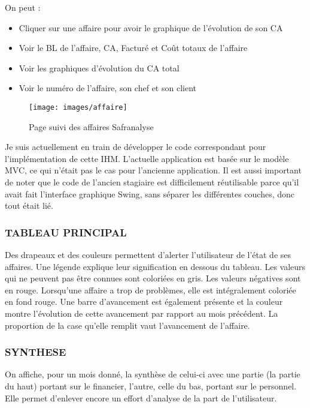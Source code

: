 On peut : 
\begin{itemize}
\item Cliquer sur une affaire pour avoir le graphique de l’évolution de son CA
\item Voir le BL de l’affaire, CA, Facturé et Coût totaux de l’affaire
\item Voir les graphiques d’évolution du CA total
\item Voir le numéro de l’affaire, son chef et son client
\end{itemize}

\begin{figure}[!h]
\center
\texttt{[image: images/affaire]}
\caption{Page suivi des affaires Safranalyse}
\end{figure}


Je suis actuellement en train de développer le code correspondant pour l’implémentation de cette IHM. L’actuelle application est basée sur le modèle MVC, ce qui n’était pas le cas pour l’ancienne application. Il est aussi important de noter que le code de l’ancien stagiaire est difficilement réutilisable parce qu’il avait fait l’interface graphique Swing, sans séparer les différentes couches, donc tout était lié.\\

\subsubsection{TABLEAU PRINCIPAL}

Des drapeaux et des couleurs permettent d’alerter l’utilisateur de l’état de ses affaires. Une légende explique leur signification en dessous du tableau. Les valeurs qui ne peuvent pas être connues sont coloriées en gris. Les valeurs négatives sont en rouge. Lorsqu’une affaire a trop de problèmes, elle est intégralement coloriée en fond rouge. Une barre d’avancement est également présente et la couleur montre l’évolution de cette avancement par rapport au mois précédent. La proportion de la case qu’elle remplit vaut l’avancement de l’affaire.\\

\subsubsection{SYNTHESE}
On affiche, pour un mois donné, la synthèse de celui-ci avec une partie (la partie du haut) portant sur le financier, l’autre, celle du bas, portant sur le personnel. Elle permet d’enlever encore un effort d’analyse de la part de l’utilisateur.\\

